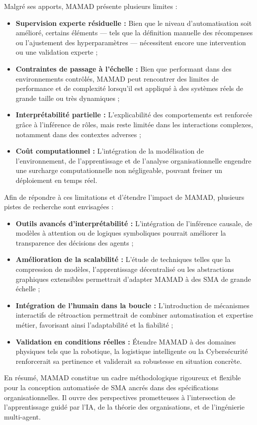 Malgré ses apports, MAMAD présente plusieurs limites :

\begin{itemize}
    \item \textbf{Supervision experte résiduelle :} Bien que le niveau d'automatisation soit amélioré, certains éléments — tels que la définition manuelle des récompenses ou l'ajustement des hyperparamètres — nécessitent encore une intervention ou une validation experte ;
    \item \textbf{Contraintes de passage à l'échelle :} Bien que performant dans des environnements contrôlés, MAMAD peut rencontrer des limites de performance et de complexité lorsqu'il est appliqué à des systèmes réels de grande taille ou très dynamiques ;
    \item \textbf{Interprétabilité partielle :} L'explicabilité des comportements est renforcée grâce à l'inférence de rôles, mais reste limitée dans les interactions complexes, notamment dans des contextes adverses ;
    \item \textbf{Coût computationnel :} L'intégration de la modélisation de l'environnement, de l'apprentissage et de l'analyse organisationnelle engendre une surcharge computationnelle non négligeable, pouvant freiner un déploiement en temps réel.
\end{itemize}

\noindent Afin de répondre à ces limitations et d'étendre l'impact de MAMAD, plusieurs pistes de recherche sont envisagées :

\begin{itemize}
    \item \textbf{Outils avancés d'interprétabilité :} L'intégration de l'inférence causale, de modèles à attention ou de logiques symboliques pourrait améliorer la transparence des décisions des agents ;
    \item \textbf{Amélioration de la scalabilité :} L'étude de techniques telles que la compression de modèles, l'apprentissage décentralisé ou les abstractions graphiques extensibles permettrait d'adapter MAMAD à des SMA de grande échelle ;
    \item \textbf{Intégration de l'humain dans la boucle :} L'introduction de mécanismes interactifs de rétroaction permettrait de combiner automatisation et expertise métier, favorisant ainsi l'adaptabilité et la fiabilité ;
    \item \textbf{Validation en conditions réelles :} Étendre MAMAD à des domaines physiques tels que la robotique, la logistique intelligente ou la Cybersécurité renforcerait sa pertinence et validerait sa robustesse en situation concrète.
\end{itemize}

\noindent En résumé, MAMAD constitue un cadre méthodologique rigoureux et flexible pour la conception automatisée de SMA ancrés dans des spécifications organisationnelles. Il ouvre des perspectives prometteuses à l'intersection de l'apprentissage guidé par l'IA, de la théorie des organisations, et de l'ingénierie multi-agent.


